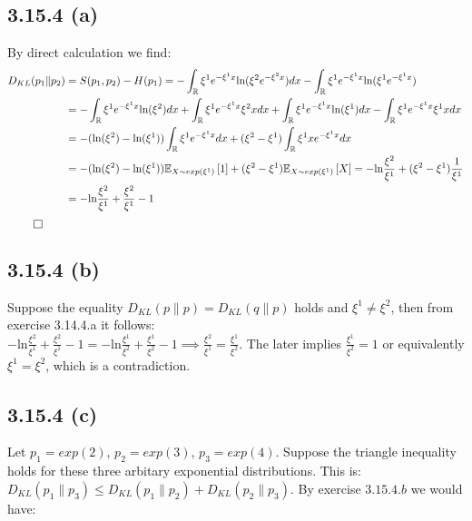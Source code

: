 \documentclass{exam}
\renewenvironment{proof}{{\noindent\itshape\ignorespaces}}{{\hfill$\qed$\\}}
\begin{document}
\subsection*{3.15.4 (a)}
By direct calculation we find:
\begin{proof}
    \begin{equation*}
        \begin{aligned}
           D_{KL}(p_1 \lVert p_2) &= S(p_1,p_2) - H(p_1) = -\displaystyle\int_{\mathbb{R}}  \xi^1 e^{-\xi^1 x} \text{ln}(\xi^2e^{-\xi^2 x}) dx  -\displaystyle\int_{\mathbb{R}}  \xi^1 e^{-\xi^1 x} \text{ln}(\xi^1e^{-\xi^1 x}) \\
           &= -\displaystyle\int_{\mathbb{R}}  \xi^1 e^{-\xi^1 x} \text{ln}(\xi^2) dx + \displaystyle\int_{\mathbb{R}}  \xi^{1} e^{-\xi^1 x} \xi^{2} x d x + \displaystyle\int_{\mathbb{R}} \xi^1 e^{-\xi^1 x} \text{ln}(\xi^1) dx  - \displaystyle\int_{\mathbb{R}} \xi^{1}e^{-\xi^{1}x} \xi^{1} x d x \\
           &= - (\text{ln}(\xi^{2}) - \text{ln}(\xi^{1}))\displaystyle\int_{\mathbb{R}}  \xi^1 e^{-\xi^1 x} dx + (\xi^{2} - \xi^{1})\displaystyle\int_{\mathbb{R}} \xi^1 x e^{-\xi^1 x} dx \\ 
           &= - (\text{ln}(\xi^{2}) - \text{ln}(\xi^{1}))\mathbb{E}_{\tiny X \sim exp(\xi^{1})}\left[1\right] + (\xi^{2} - \xi^{1})\mathbb{E}_{\tiny X \sim exp(\xi^{1})}\left[ X \right] = - \text{ln}\frac{\xi^{2}}{\xi^{1}} + (\xi^{2} - \xi^{1})\frac{1}{\xi^{1}} \\
           &= - \text{ln}\frac{\xi^{2}}{\xi^{1}} + \frac{\xi^{2}}{\xi^{1}} - 1
        \end{aligned}
    \end{equation*}
\end{proof}

\subsection*{3.15.4 (b)}
Suppose the equality $D_{KL}(p \lVert p) = D_{KL}(q \lVert p)$ holds and $\xi^{1} \neq \xi^{2}$, then from exercise 3.14.4.a it follows: \\
$- \text{ln}\frac{\xi^{2}}{\xi^{1}} + \frac{\xi^{2}}{\xi^{1}} - 1 = - \text{ln}\frac{\xi^{1}}{\xi^{2}} + \frac{\xi^{1}}{\xi^{2}} - 1 \implies \frac{\xi^{2}}{\xi^{1}} = \frac{\xi^{1}}{\xi^{2}}$. The later implies 
$\frac{\xi^{1}}{\xi^{2}} = 1$ or equivalently $\xi^{1} = \xi^{2}$, which is a contradiction. 

\subsection*{3.15.4 (c)}
Let $p_1 = exp(2)$, $p_2 = exp(3)$, $p_3 = exp(4)$. Suppose the triangle inequality holds for these three arbitary exponential distributions. This is:\\
$D_{KL}(p_1 \lVert p_3) \leq D_{KL}(p_1 \lVert p_2) + D_{KL}(p_2 \lVert p_3)$. By exercise $3.15.4.b$ we would have:
\end{document}
